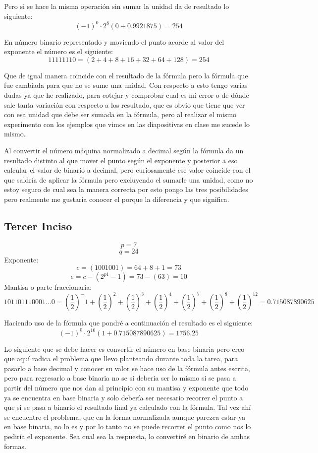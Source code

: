 \documentclass{article}
\begin{document}
Pero si se hace la misma operación sin sumar la unidad da de resultado lo siguiente:
$$(-1)^0\cdot2^8(0 + 0. 9921875 ) = 254$$

En número binario representado y moviendo el punto acorde al valor del exponente
el número es el siguiente:
$$11111110 = (2 + 4 + 8 + 16 + 32 + 64 + 128) = 254$$

Que de igual manera coincide con el resultado de la fórmula pero la fórmula que fue
cambiada para que no se sume una unidad. Con respecto a esto tengo varias dudas
ya que he realizado, para cotejar y comprobar cual es mi error o de dónde sale tanta
variación con respecto a los resultado, que es obvio que tiene que ver con esa
unidad que debe ser sumada en la fórmula, pero al realizar el mismo experimento
con los ejemplos que vimos en las diapositivas en clase me sucede lo mismo.

Al convertir el número máquina normalizado a decimal según la fórmula da un
resultado distinto al que mover el punto según el exponente y posterior a eso
calcular el valor de binario a decimal, pero curiosamente ese valor coincide con el
que saldría de aplicar la fórmula pero excluyendo el sumarle una unidad, como no
estoy seguro de cual sea la manera correcta por esto pongo las tres posibilidades
pero realmente me gustaria conocer el porque la diferencia y que significa.

\subsection{Tercer Inciso}
$$p = 7$$
$$q = 24$$
Exponente: 
$$c = (1001001) = 64 + 8 + 1 = 73$$
$$e = c - (2^{p1} - 1) = 73 - (63) = 10$$
Mantisa o parte fraccionaria:
$$101101110001... 0 = (\frac{1}{2})^-1 + (\frac{1}{2})^2+ (\frac{1}{2})^3 + (\frac{1}{2})^4 + (\frac{1}{2})^7 + (\frac{1}{2})^8 + (\frac{1}{2})^12 =0. 715087890625 $$

Haciendo uso de la fórmula que pondré a continuación el resultado es el siguiente:
$$(- 1)^0\cdot2^{10}(1 + 0. 715087890625) = 1756. 25$$

Lo siguiente que se debe hacer es convertir el número en base binaria pero creo
que aquí radica el problema que llevo planteando durante toda la tarea, para pasarlo
a base decimal y conocer su valor se hace uso de la fórmula antes escrita, pero
para regresarlo a base binaria no se si deberia ser lo mismo si se pasa a partir del
número que nos dan al principio con su mantisa y exponente que todo ya se
encuentra en base binaria y solo debería ser necesario recorrer el punto a que si se
pasa a binario el resultado final ya calculado con la fórmula. Tal vez ahí se
encuentre el problema, que en la forma normalizada aunque parezca estar ya en
base binaria, no lo es y por lo tanto no se puede recorrer el punto como nos lo
pediría el exponente. Sea cual sea la respuesta, lo convertiré en binario de ambas
formas.
\end{document}
